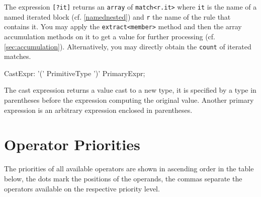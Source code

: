 The  expression \texttt{[?it]} returns an \texttt{array} of \texttt{match<r.it>} 
where \texttt{it} is the name of a named iterated block (cf. \ref{namednested}) and \texttt{r} the name of the rule that contains it.
You may apply the \texttt{extract<member>} method and then the array accumulation methods on it to get a value for further processing (cf. \ref{sec:accumulation}).
Alternatively, you may directly obtain the \texttt{count} of iterated matches.

\begin{rail}
  CastExpr: '(' PrimitiveType ')' PrimaryExpr;
\end{rail}

The cast expression returns a value cast to a new type, it is specified by a type in parentheses before the expression computing the original value.
Another primary expression is an arbitrary expression enclosed in parentheses.


\section{Operator Priorities}

The priorities of all available operators are shown in ascending order in the table below, the dots mark the positions of the operands, the commas separate the operators available on the respective priority level.

